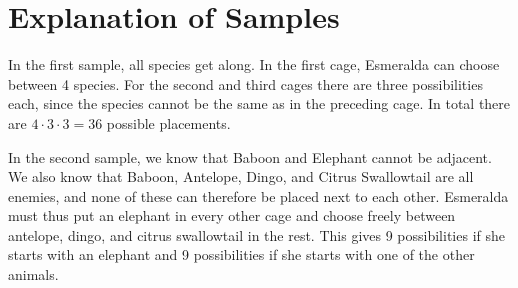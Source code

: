 \section*{Explanation of Samples}
In the first sample, all species get along. In the first cage, Esmeralda can choose between 4 species. For the second and third cages there are three possibilities each, since the species cannot be the same as in the preceding cage. In total there are $4\cdot 3\cdot 3=36$ possible placements.

In the second sample, we know that Baboon and Elephant cannot be adjacent. We also know that Baboon, Antelope, Dingo, and Citrus Swallowtail are all enemies, and none of these can therefore be placed next to each other. Esmeralda must thus put an elephant in every other cage and choose freely between antelope, dingo, and citrus swallowtail in the rest. This gives 9 possibilities if she starts with an elephant and 9 possibilities if she starts with one of the other animals.

